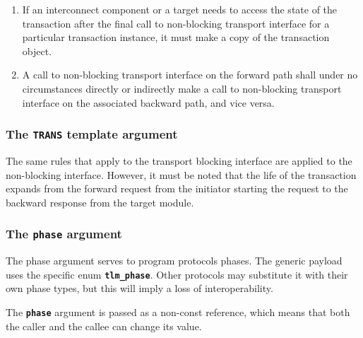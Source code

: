 {\begin{enumerate}
	After that, any interconnect component or target must assume that the transaction object is invalid.
	\item If an interconnect component or a target needs to access the state of the transaction after the final call to non-blocking transport interface for a particular transaction instance, it must make a copy of the transaction object.
	\item A call to non-blocking transport interface on the forward path shall under no circumstances directly or indirectly make a call to non-blocking transport interface on the associated backward path, and vice versa.
\end{enumerate}

\subsubsection{The \texttt{TRANS} template argument}
The same rules that apply to the transport blocking interface are applied to the non-blocking interface.
However, it must be noted that the life of the transaction expands from the forward request from the initiator starting the request to the backward response from the target module.

\subsubsection{The \texttt{phase} argument}
The phase argument serves to program protocols phases.
The generic payload uses the specific enum \texttt{\textbf{tlm\_phase}}.
Other protocols may substitute it with their own phase types, but this will imply a loss of interoperability.

The \texttt{\textbf{phase}} argument is passed as a non-const reference, which means that both the caller and the callee can change its value.

}
